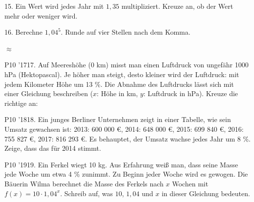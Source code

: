 \documentclass[11pt]{article}
\begin{document}
\pfgruppe{}
\begin{pfaufg}{}{15.}{}
Ein Wert wird jedes Jahr mit $1{,}35$ multipliziert. Kreuze an, ob der Wert mehr oder weniger wird. 
\end{pfaufg}
\begin{pfaufg}{}{16.}{}
Berechne $1{,}04^5$. Runde auf vier Stellen nach dem Komma.
\par\noindent $\approx$ \leerfeld \par
{}
\end{pfaufg}
\pfgruppe{}
\begin{pfaufg}{P10 ’17}{\llap{\textasteriskcentered\,}17.}{}
Auf Meereshöhe (0 km) misst man einen Luftdruck von ungefähr 1000 hPa (Hektopascal). Je höher man steigt, desto kleiner wird der Luftdruck: mit jedem Kilometer Höhe um 13 \%. Die Abnahme des Luftdrucks lässt sich mit einer Gleichung beschreiben ($x$: Höhe in km, $y$: Luftdruck in hPa). Kreuze die richtige an:
\par\smallskip\noindent {}\par
{}
\end{pfaufg}
\pfgruppe{}
\begin{pfaufg}{P10 ’18}{18.}{}
Ein junges Berliner Unternehmen zeigt in einer Tabelle, wie sein Umsatz gewachsen ist: 2013: 600 000 €, 2014: 648 000 €, 2015: 699 840 €, 2016: 755 827 €, 2017: 816 293 €. Es behauptet, der Umsatz wachse jedes Jahr um 8 \%. Zeige, dass das für 2014 stimmt.
\par\smallskip\noindent {}\par
{}
\end{pfaufg}
\begin{pfaufg}{P10 ’19}{\llap{\textasteriskcentered\,}19.}{}
Ein Ferkel wiegt 10 kg. Aus Erfahrung weiß man, dass seine Masse jede Woche um etwa 4 \% zunimmt. Zu Beginn jeder Woche wird es gewogen. Die Bäuerin Wilma berechnet die Masse des Ferkels nach $x$ Wochen mit $f(x) = 10 \cdot 1{,}04^x$. Schreib auf, was $10$, $1{,}04$ und $x$ in dieser Gleichung bedeuten.
\par\smallskip\noindent {}\par
{}
\end{pfaufg}
\end{document}
